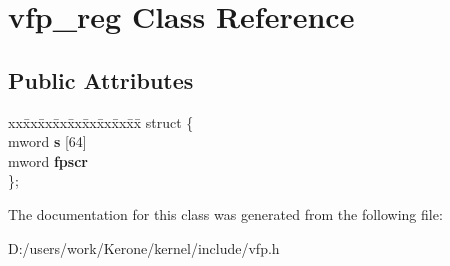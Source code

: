 \section{vfp\+\_\+reg Class Reference}
\label{classvfp__reg}
\subsection*{Public Attributes}
\begin{DoxyCompactItemize}
\item 
\mbox{\label{classvfp__reg_a7da3586ebf7535a347f6bc3c6144d5dd}} 
\begin{tabbing}
xx\=xx\=xx\=xx\=xx\=xx\=xx\=xx\=xx\=\kill
struct \{\\
\>mword {\bfseries s} [64]\\
\>mword {\bfseries fpscr}\\
\}; \\

\end{tabbing}\end{DoxyCompactItemize}


The documentation for this class was generated from the following file\+:\begin{DoxyCompactItemize}
\item 
D\+:/users/work/\+Kerone/kernel/include/vfp.\+h\end{DoxyCompactItemize}
